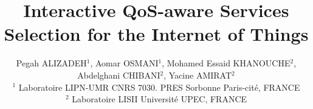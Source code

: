 \documentclass[10pt,journal,compsoc]{IEEEtran}
\begin{document}
%
\title{Interactive QoS-aware Services Selection for the Internet of Things}
%
%
%
%


\author{\small{Pegah ALIZADEH$^{1}$, Aomar OSMANI$^{1}$, Mohamed Essaid KHANOUCHE$^{2}$, Abdelghani CHIBANI$^{2}$, Yacine AMIRAT$^{2}$ \\
$^{1}$ Laboratoire LIPN-UMR CNRS 7030. PRES Sorbonne Paris-cit\'e, FRANCE \\    
$^{2}$ Laboratoire LISII  Universit\'e UPEC, FRANCE \\
}}

\end{document}
